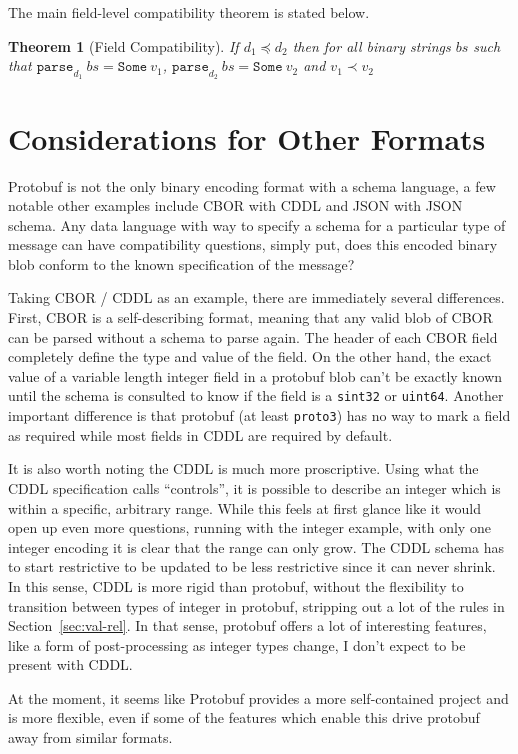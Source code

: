 \documentclass[11pt]{article}
\theoremstyle{definition}
\theoremstyle{plain}
\newtheorem{theorem}{Theorem}
\begin{document}
The main field-level compatibility theorem is stated below.
\\
\begin{theorem}[Field Compatibility]
  If $d_1 \preceq d_2$ then for all binary strings $bs$ such that
  $\mathtt{parse}_{d_1}\ bs = \mathtt{Some}\ v_1$, $\mathtt{parse}_{d_2}\ bs =
  \mathtt{Some}\ v_2$ and $v_1 \prec v_2$
\end{theorem}

\section{Considerations for Other Formats}

Protobuf is not the only binary encoding format with a schema language, a few
notable other examples include CBOR with CDDL and JSON with JSON schema. Any
data language with way to specify a schema for a particular type of message can
have compatibility questions, simply put, does this encoded binary blob conform
to the known specification of the message?

Taking CBOR / CDDL as an example, there are immediately several
differences. First, CBOR is a self-describing format, meaning that any valid
blob of CBOR can be parsed without a schema to parse again. The header of each
CBOR field completely define the type and value of the field. On the other hand,
the exact value of a variable length integer field in a protobuf blob can't be
exactly known until the schema is consulted to know if the field is a
\texttt{sint32} or \texttt{uint64}. Another important difference is that
protobuf (at least \texttt{proto3}) has no way to mark a field as required while
most fields in CDDL are required by default.

It is also worth noting the CDDL is much more proscriptive. Using what the CDDL
specification calls ``controls'', it is possible to describe an integer which is
within a specific, arbitrary range. While this feels at first glance like it
would open up even more questions, running with the integer example, with only
one integer encoding it is clear that the range can only grow. The CDDL schema
has to start restrictive to be updated to be less restrictive since it can never
shrink. In this sense, CDDL is more rigid than protobuf, without the flexibility
to transition between types of integer in protobuf, stripping out a lot of the
rules in Section~\ref{sec:val-rel}. In that sense, protobuf offers a lot of
interesting features, like a form of post-processing as integer types change,
I don't expect to be present with CDDL.

At the moment, it seems like Protobuf provides a more self-contained project and
is more flexible, even if some of the features which enable this drive protobuf
away from similar formats. 

\printbibliography{}
\end{document}
